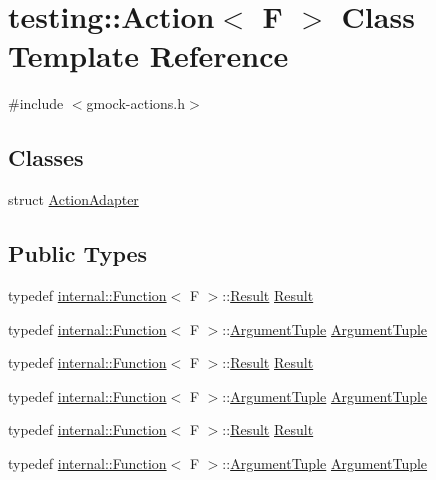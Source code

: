 \hypertarget{classtesting_1_1_action}{}\section{testing\+::Action$<$ F $>$ Class Template Reference}
\label{classtesting_1_1_action}


{\ttfamily \#include $<$gmock-\/actions.\+h$>$}

\subsection*{Classes}
\begin{DoxyCompactItemize}
\item 
struct \mbox{\hyperlink{structtesting_1_1_action_1_1_action_adapter}{Action\+Adapter}}
\end{DoxyCompactItemize}
\subsection*{Public Types}
\begin{DoxyCompactItemize}
\item 
typedef \mbox{\hyperlink{structtesting_1_1internal_1_1_function}{internal\+::\+Function}}$<$ F $>$\+::\mbox{\hyperlink{classtesting_1_1_action_a9af08a21ad329331fde856cba9b6dea2}{Result}} \mbox{\hyperlink{classtesting_1_1_action_a9af08a21ad329331fde856cba9b6dea2}{Result}}
\item 
typedef \mbox{\hyperlink{structtesting_1_1internal_1_1_function}{internal\+::\+Function}}$<$ F $>$\+::\mbox{\hyperlink{classtesting_1_1_action_ae27fda510696a9294f991de5b1abfaf2}{Argument\+Tuple}} \mbox{\hyperlink{classtesting_1_1_action_ae27fda510696a9294f991de5b1abfaf2}{Argument\+Tuple}}
\item 
typedef \mbox{\hyperlink{structtesting_1_1internal_1_1_function}{internal\+::\+Function}}$<$ F $>$\+::\mbox{\hyperlink{classtesting_1_1_action_a9af08a21ad329331fde856cba9b6dea2}{Result}} \mbox{\hyperlink{classtesting_1_1_action_a9af08a21ad329331fde856cba9b6dea2}{Result}}
\item 
typedef \mbox{\hyperlink{structtesting_1_1internal_1_1_function}{internal\+::\+Function}}$<$ F $>$\+::\mbox{\hyperlink{classtesting_1_1_action_ae27fda510696a9294f991de5b1abfaf2}{Argument\+Tuple}} \mbox{\hyperlink{classtesting_1_1_action_ae27fda510696a9294f991de5b1abfaf2}{Argument\+Tuple}}
\item 
typedef \mbox{\hyperlink{structtesting_1_1internal_1_1_function}{internal\+::\+Function}}$<$ F $>$\+::\mbox{\hyperlink{classtesting_1_1_action_a9af08a21ad329331fde856cba9b6dea2}{Result}} \mbox{\hyperlink{classtesting_1_1_action_a9af08a21ad329331fde856cba9b6dea2}{Result}}
\item 
typedef \mbox{\hyperlink{structtesting_1_1internal_1_1_function}{internal\+::\+Function}}$<$ F $>$\+::\mbox{\hyperlink{classtesting_1_1_action_ae27fda510696a9294f991de5b1abfaf2}{Argument\+Tuple}} \mbox{\hyperlink{classtesting_1_1_action_ae27fda510696a9294f991de5b1abfaf2}{Argument\+Tuple}}
\end{DoxyCompactItemize}
